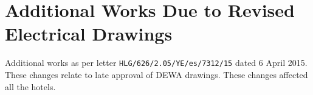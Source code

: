 \begin{comment}
HLS DSE-JV have submitted as early as 2014 RFIs outlining concerns regarding the adequacy of the ventilation openings and sizing of Generator rooms in the basements.

On the 25 March 2015, we were instructed to proceed with the purchase of additional fans from Systemaire. We issued the order request on the ..... and the order placed on the ......  without formal approval of the amounts in order to speed up the purchase. This affected the commissioning of the generators.

\chapter{Transformer Room Ventilation}

\subsection{Background}

\subsection{Design Errors}
\end{comment}


\chapter{Additional Works Due to Revised Electrical Drawings}
\label{electrical}
Additional works as per letter \texttt{HLG/626/2.05/YE/es/7312/15} dated 6 April 2015. These changes relate to late approval of DEWA drawings. These changes affected all the hotels.

